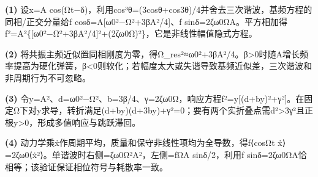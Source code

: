 \par\noindent\textbf{(1)} 设x=A cos(Ωt−δ)，利用cos³θ=(3cosθ+cos3θ)/4并舍去三次谐波，基频方程的同相/正交分量给f cosδ=A[ω0²−Ω²+3βA²/4]、f sinδ=2ζω0ΩA。平方相加得f²=A²\{[ω0²−Ω²+3βA²/4]²+(2ζω0Ω)²\}，它是非线性幅值隐式方程。
\par\noindent\textbf{(2)} 将共振主频近似置同相刚度为零，得Ω\_res²≈ω0²+3βA²/4。β>0时随A增长频率提高为硬化弹簧，β<0则软化；若幅度太大或失谐导致基频近似差，三次谐波和非周期行为不可忽略。
\par\noindent\textbf{(3)} 令y=A²、d=ω0²−Ω²、b=3β/4、γ=2ζω0Ω，响应方程f²=y[(d+by)²+γ²]。在固定Ω下对y求导，转折满足(d+by)(d+3by)+γ²=0；要有两个实折叠点需d²>3γ²且正根y>0，形成多值响应与跳跃滞回。
\par\noindent\textbf{(4)} 动力学乘ẋ作周期平均，质量和保守非线性项均为全导数，得f⟨cosΩt ẋ⟩=2ζω0⟨ẋ²⟩。单谐波时右侧=ζω0Ω²A²，左侧=fΩA sinδ/2，利用f sinδ=2ζω0ΩA恰相等；该验证保证相位符号与耗散率一致。
